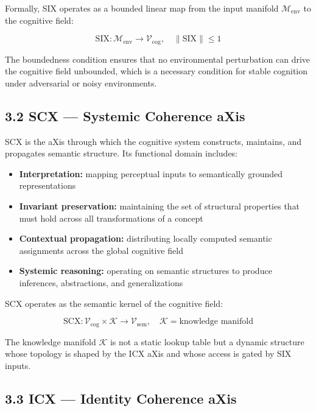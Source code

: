 Formally, SIX operates as a bounded linear map from the input manifold \(\mathcal{M}_{\text{env}}\) to the cognitive field:

\[
\mathrm{SIX}: \mathcal{M}_{\text{env}} \rightarrow \mathcal{V}_{\text{cog}}, \quad
\|\mathrm{SIX}\| \leq 1
\]

The boundedness condition ensures that no environmental perturbation can drive the cognitive field unbounded, which is a necessary condition for stable cognition under adversarial or noisy environments.

\subsection{3.2 SCX --- Systemic Coherence aXis}\label{scx-systemic-coherence-axis}

SCX is the aXis through which the cognitive system constructs, maintains, and propagates semantic structure. Its functional domain includes:

\begin{itemize}
\tightlist
\item
  \textbf{Interpretation:} mapping perceptual inputs to semantically grounded representations
\item
  \textbf{Invariant preservation:} maintaining the set of structural properties that must hold across all transformations of a concept
\item
  \textbf{Contextual propagation:} distributing locally computed semantic assignments across the global cognitive field
\item
  \textbf{Systemic reasoning:} operating on semantic structures to produce inferences, abstractions, and generalizations
\end{itemize}

SCX operates as the semantic kernel of the cognitive field:

\[
\mathrm{SCX}: \mathcal{V}_{\text{cog}} \times \mathcal{K} \rightarrow
\mathcal{V}_{\text{sem}}, \quad \mathcal{K} = \text{knowledge manifold}
\]

The knowledge manifold \(\mathcal{K}\) is not a static lookup table but a dynamic structure whose topology is shaped by the ICX aXis and whose access is gated by SIX inputs.

\subsection{3.3 ICX --- Identity Coherence aXis}\label{icx-soul-identity-axis}

